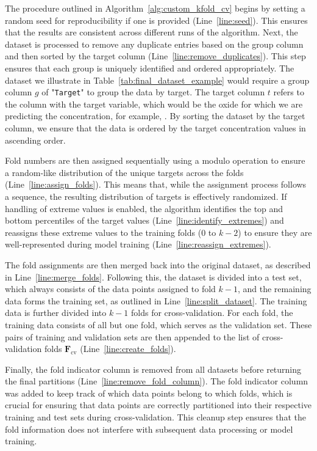 The procedure outlined in Algorithm~\ref{alg:custom_kfold_cv} begins by setting a random seed for reproducibility if one is provided (Line~\ref{line:seed}).
This ensures that the results are consistent across different runs of the algorithm.
Next, the dataset is processed to remove any duplicate entries based on the group column and then sorted by the target column (Line~\ref{line:remove_duplicates}).
This step ensures that each group is uniquely identified and ordered appropriately.
The dataset we illustrate in Table~\ref{tab:final_dataset_example} would require a group column $g$ of "\texttt{Target}" to group the data by target.
The target column $t$ refers to the column with the target variable, which would be the oxide for which we are predicting the concentration, for example, .
By sorting the dataset by the target column, we ensure that the data is ordered by the target concentration values in ascending order.

Fold numbers are then assigned sequentially using a modulo operation to ensure a random-like distribution of the unique targets across the folds (Line~\ref{line:assign_folds}).
This means that, while the assignment process follows a sequence, the resulting distribution of targets is effectively randomized.
If handling of extreme values is enabled, the algorithm identifies the top and bottom percentiles of the target values (Line~\ref{line:identify_extremes}) and reassigns these extreme values to the training folds (0 to \( k-2 \)) to ensure they are well-represented during model training (Line~\ref{line:reassign_extremes}).

The fold assignments are then merged back into the original dataset, as described in Line~\ref{line:merge_folds}.
Following this, the dataset is divided into a test set, which always consists of the data points assigned to fold \( k-1 \), and the remaining data forms the training set, as outlined in Line~\ref{line:split_dataset}.
The training data is further divided into \( k-1 \) folds for cross-validation.
For each fold, the training data consists of all but one fold, which serves as the validation set.
These pairs of training and validation sets are then appended to the list of cross-validation folds \(\mathbf{F}_\text{cv}\) (Line~\ref{line:create_folds}).

Finally, the fold indicator column is removed from all datasets before returning the final partitions (Line~\ref{line:remove_fold_column}).
The fold indicator column was added to keep track of which data points belong to which folds, which is crucial for ensuring that data points are correctly partitioned into their respective training and test sets during cross-validation. 
This cleanup step ensures that the fold information does not interfere with subsequent data processing or model training.

